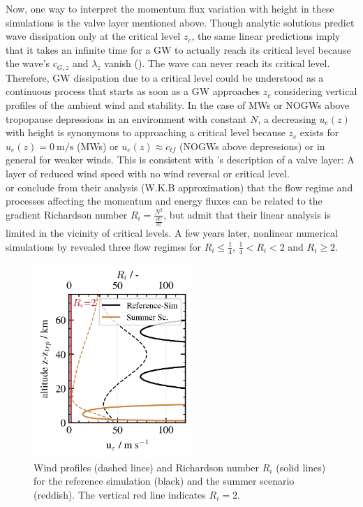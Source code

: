 Now, one way to interpret the momentum flux variation with height in these simulations is the valve layer mentioned above. Though analytic solutions predict wave dissipation only at the critical level $z_c$, the same linear predictions imply that it takes an infinite time for a GW to actually reach its critical level because the wave's $c_{G,z}$ and $\lambda_z$ vanish (\cite[]{lin_mesoscale_2007}). The wave can never reach its critical level. Therefore, GW dissipation due to a critical level could be understood as a continuous process that starts as soon as a GW approaches $z_c$ considering vertical profiles of the ambient wind and stability. In the case of MWs or NOGWs above tropopause depressions in an environment with constant $N$, a decreasing $u_e(z)$ with height is synonymous to approaching a critical level because $z_c$ exists for $u_e(z)= \SI{0}{\meter\per\second}$ (MWs) or $u_e(z) \approx c_{tf}$ (NOGWs above depressions) or in general for weaker winds. This is consistent with \textcite[]{kruse_midlatitude_2016}'s description of a valve layer: A layer of reduced wind speed with no wind reversal or critical level. \\
\textcite[]{bretherton_propagation_1966} or \textcite[]{booker_critical_1967} conclude from their analysis (W.K.B approximation) that the flow regime and processes affecting the momentum and energy fluxes can be related to the gradient Richardson number $R_i=\frac{N^2}{\frac{\partial U}{\partial z}}$, but admit that their linear analysis is limited in the vicinity of critical levels. A few years later, nonlinear numerical simulations by \textcite[]{breeding_non-linear_1971} revealed three flow regimes for $R_i \leq \frac{1}{4}$, $\frac{1}{4} < R_i < 2$ and $R_i \geq 2$.
\begin{figure}
    \includegraphics[width=6cm]{figures_q3D/critical-layer-ana.png}
    \caption{Wind profiles (dashed lines) and Richardson number $R_i$ (solid lines) for the reference simulation (black) and the summer scenario (reddish). The vertical red line indicates $R_i=2$.}
    \label{fig:ri}
\end{figure}
